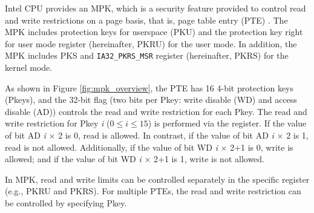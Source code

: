 
Intel CPU provides an MPK, which is a security feature provided to control read
and write restrictions on a page basis, that is, page table entry (PTE)
\cite{intel-mpk}.
%
The MPK includes protection keys for userspace (PKU) and the protection key
right for user mode register (hereinafter, PKRU) for the user mode.
In addition, the MPK includes PKS and \verb|IA32_PKRS_MSR| register
(hereinafter, PKRS) for the kernel mode.

As shown in Figure \ref{fig:mpk_overview}, the PTE has 16 4-bit protection keys
(Pkeys), and the 32-bit flag (two bits per Pkey: write disable (WD) and access
disable (AD)) controls the read and write restriction for each Pkey.
%
The read and write restriction for Pkey {\it i} ($0 \leq i \leq 15$) is performed via the
register. If the value of bit AD {\it i} $\times$ 2 is 0, read is allowed. In contrast,
if the value of bit AD {\it i} $\times$ 2 is 1, read is not allowed.
%
Additionally, if the value of bit WD {\it i} $\times$ 2+1 is 0, write is allowed; and if the
value of bit WD {\it i} $\times$ 2+1 is 1, write is not allowed.

In MPK, read and write limits can be controlled separately in the specific
register (e.g., PKRU and PKRS). For multiple PTEs, the read and write
restriction can be controlled by specifying Pkey.






